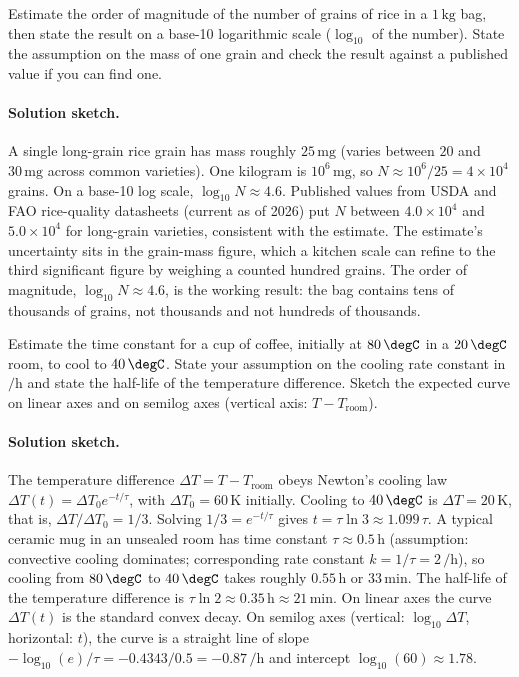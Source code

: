 \begin{exercise}
Estimate the order of magnitude of the number of grains of rice in a
$1 \,\si{\kilogram}$ bag, then state the result on a base-10
logarithmic scale ($\log_{10}$ of the number). State the assumption
on the mass of one grain and check the result against a published
value if you can find one.

\paragraph{Solution sketch.}
A single long-grain rice grain has mass roughly $25\,\si{\milli
\gram}$ (varies between $20$ and $30\,\si{\milli\gram}$ across
common varieties). One kilogram is $10^{6}\,\si{\milli\gram}$, so
$N \approx 10^{6} / 25 = 4 \times 10^{4}$ grains. On a base-10 log
scale, $\log_{10} N \approx 4.6$. Published values from USDA and
FAO rice-quality datasheets (current as of 2026) put $N$ between
$4.0 \times 10^{4}$ and $5.0 \times 10^{4}$ for long-grain
varieties, consistent with the estimate. The estimate's uncertainty
sits in the grain-mass figure, which a kitchen scale can refine to
the third significant figure by weighing a counted hundred grains.
The order of magnitude, $\log_{10} N \approx 4.6$, is the working
result: the bag contains tens of thousands of grains, not thousands
and not hundreds of thousands.
\end{exercise}

\begin{exercise}
Estimate the time constant for a cup of coffee, initially at
$80 \,\degC$ in a $20 \,\degC$ room, to cool to $40 \,\degC$. State
your assumption on the cooling rate constant in $\si{\per\hour}$ and
state the half-life of the temperature difference. Sketch the
expected curve on linear axes and on semilog axes (vertical
axis: $T - T_{\text{room}}$).

\paragraph{Solution sketch.}
The temperature difference $\Delta T = T - T_{\text{room}}$ obeys
Newton's cooling law $\Delta T(t) = \Delta T_{0} e^{-t/\tau}$, with
$\Delta T_{0} = 60\,\si{\kelvin}$ initially. Cooling to $40\,\degC$
is $\Delta T = 20\,\si{\kelvin}$, that is, $\Delta T/\Delta T_{0}
= 1/3$. Solving $1/3 = e^{-t/\tau}$ gives $t = \tau \ln 3 \approx
1.099\,\tau$. A typical ceramic mug in an unsealed room has time
constant $\tau \approx 0.5\,\si{\hour}$ (assumption: convective
cooling dominates; corresponding rate constant $k = 1/\tau =
2\,\si{\per\hour}$), so cooling from $80\,\degC$ to $40\,\degC$
takes roughly $0.55\,\si{\hour}$ or $33\,\si{\minute}$. The
half-life of the temperature difference is $\tau \ln 2 \approx
0.35\,\si{\hour} \approx 21\,\si{\minute}$. On linear axes the
curve $\Delta T(t)$ is the standard convex decay. On semilog
axes (vertical: $\log_{10} \Delta T$, horizontal: $t$), the curve
is a straight line of slope $-\log_{10}(e)/\tau = -0.4343 / 0.5 =
-0.87\,\si{\per\hour}$ and intercept $\log_{10}(60) \approx 1.78$.
\end{exercise}

